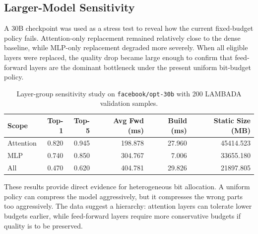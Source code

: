\subsection{Larger-Model Sensitivity}
A 30B checkpoint was used as a stress test to reveal how the current fixed-budget policy fails. Attention-only replacement remained relatively close to the dense baseline, while MLP-only replacement degraded more severely. When all eligible layers were replaced, the quality drop became large enough to confirm that feed-forward layers are the dominant bottleneck under the present uniform bit-budget policy.

\begin{table}[H]
\centering
\caption{Layer-group sensitivity study on \texttt{facebook/opt-30b} with 200 LAMBADA validation samples.}
\label{tab:30b-sensitivity}
\begin{tabular}{lrrrrr}
\toprule
Scope & Top-1 & Top-5 & Avg Fwd (ms) & Build (ms) & Static Size (MB) \\
\midrule
Attention & 0.820 & 0.945 & 198.878 & 27.960 & 45414.523 \\
MLP & 0.740 & 0.850 & 304.767 & 7.006 & 33655.180 \\
All & 0.470 & 0.620 & 404.781 & 29.826 & 21897.805 \\
\bottomrule
\end{tabular}
\end{table}

These results provide direct evidence for heterogeneous bit allocation. A uniform policy can compress the model aggressively, but it compresses the wrong parts too aggressively. The data suggest a hierarchy: attention layers can tolerate lower budgets earlier, while feed-forward layers require more conservative budgets if quality is to be preserved.

